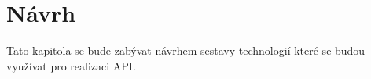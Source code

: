 \chapter{Návrh}
Tato kapitola se bude zabývat návrhem sestavy technologií které se budou využívat pro realizaci API.